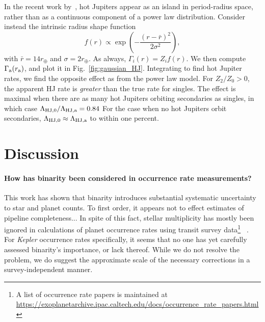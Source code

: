 \documentclass[12pt,modern]{aastex61}
\renewcommand{\a}{_{\rm a}}
\begin{document}
In the recent work by~\citet{petigura_CKS_2017}, hot Jupiters appear as an 
island in period-radius space, rather than as a continuous component of a 
power law distribution.
Consider instead the intrinsic radius shape function
\begin{equation}
f(r) \propto \exp \left( -\frac{(r-\bar{r})^2}{2\sigma^2} \right),
\end{equation}
with $\bar{r} = 14r_\oplus$ and $\sigma = 2r_\oplus$.
As always, $\Gamma_i(r) = Z_i f(r)$.
We then compute $\Gamma\a(r\a)$, and plot it in Fig.~\ref{fig:gaussian_HJ}.
Integrating to find hot Jupiter rates,
we find the opposite effect as from the power law model.
For $Z_2/Z_0>0$, 
the apparent HJ rate is {\it greater} than the true rate for singles.
The effect is maximal when there are as many hot Jupiters orbiting secondaries 
as singles, in which case
$\Lambda_{{\rm HJ},0}/\Lambda_{\rm HJ,a} = 0.84$
For the case when no hot Jupiters orbit secondaries, $\Lambda_{{\rm HJ},0} 
\approx \Lambda_{\rm HJ,a}$ to within one percent.


%

\section{Discussion}
\label{sec:discussion}

\paragraph{How has binarity been considered in occurrence rate measurements?}
This work has shown that binarity introduces substantial systematic 
uncertainty to star and planet counts.
To first order, it appears not to effect estimates of pipeline completeness...
In spite of this fact, stellar multiplicity has mostly been ignored in 
calculations of planet occurrence rates using transit survey data\footnote{
    A list of occurrence rate papers is maintained at 
    \url{https://exoplanetarchive.ipac.caltech.edu/docs/occurrence_rate_papers.html}
}~
\citep[\textit{e.g.},][]{howard_planet_2012,fressin_false_2013,foreman-mackey_exoplanet_2014,dressing_occurrence_2015,burke_terrestrial_2015}.
For {\it Kepler} occurrence rates specifically, it seems that no one has yet 
carefully assessed binarity's importance, or lack thereof.
While we do not resolve the problem, we do suggest
the approximate scale of the necessary corrections in a survey-independent 
manner.
\end{document}

